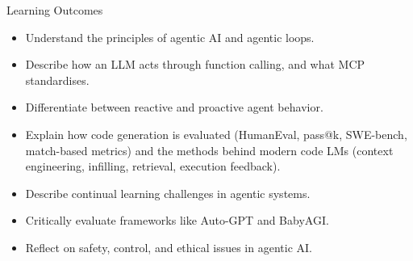 \begin{frame}{Learning Outcomes}
  \begin{itemize}
    \item Understand the principles of agentic AI and agentic loops.
    \item Describe how an LLM acts through function calling, and what MCP standardises.
    \item Differentiate between reactive and proactive agent behavior.
    \item Explain how code generation is evaluated (HumanEval, pass@k, SWE-bench, match-based metrics) and
      the methods behind modern code LMs (context engineering, infilling, retrieval, execution feedback).
    \item Describe continual learning challenges in agentic systems.
    \item Critically evaluate frameworks like Auto-GPT and BabyAGI.
    \item Reflect on safety, control, and ethical issues in agentic AI.
  \end{itemize}
\end{frame}
